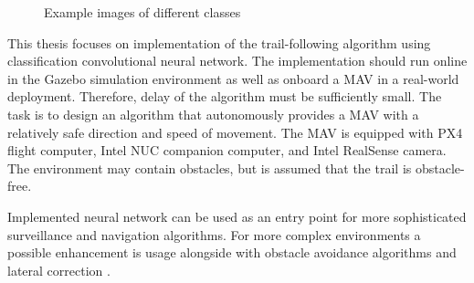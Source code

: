 \begin{figure}[!h]
\begin{minipage}{.5\linewidth}
  \end{minipage}\par\medskip
  \centering
  \caption{Example images of different classes}
  \label{fig:classes}
\end{figure}

This thesis focuses on implementation of the trail-following algorithm using classification convolutional neural network. The implementation should run online in the Gazebo simulation environment as well as onboard a \acs{MAV} in a real-world deployment. Therefore, delay of the algorithm must be sufficiently small. The task is to design an algorithm that autonomously provides a \acs{MAV} with a relatively safe direction and speed of movement. The \acs{MAV} is equipped with PX4 flight computer, Intel NUC companion computer, and Intel RealSense camera. The environment may contain obstacles, but is assumed that the trail is obstacle-free. 

Implemented neural network can be used as an entry point for more sophisticated surveillance and navigation algorithms. For more complex environments a possible enhancement is usage alongside with obstacle avoidance algorithms and lateral correction \cite{back2020autonomous, maciel2018extending, smolyanskiy2017toward}.















